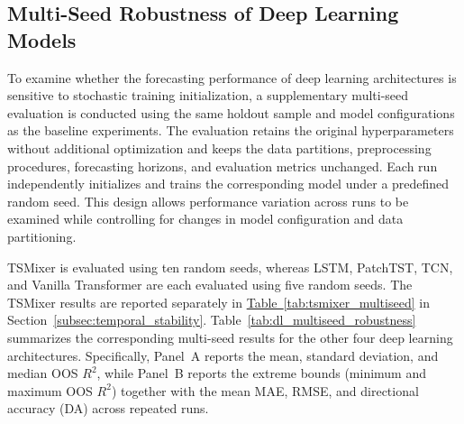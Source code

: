 \documentclass[12pt,twoside]{ord}
\begin{document}
\subsection{Multi-Seed Robustness of Deep Learning Models}\label{subsec:multiseed_robustness}

To examine whether the forecasting performance of deep learning architectures is sensitive to stochastic training initialization, a supplementary multi-seed evaluation is conducted using the same holdout sample and model configurations as the baseline experiments. The evaluation retains the original hyperparameters without additional optimization and keeps the data partitions, preprocessing procedures, forecasting horizons, and evaluation metrics unchanged. Each run independently initializes and trains the corresponding model under a predefined random seed. This design allows performance variation across runs to be examined while controlling for changes in model configuration and data partitioning.

TSMixer is evaluated using ten random seeds, whereas LSTM, PatchTST, TCN, and Vanilla Transformer are each evaluated using five random seeds. The TSMixer results are reported separately in \hyperref[tab:tsmixer_multiseed]{Table~\ref*{tab:tsmixer_multiseed}} in Section~\ref{subsec:temporal_stability}. Table~\ref{tab:dl_multiseed_robustness} summarizes the corresponding multi-seed results for the other four deep learning architectures. Specifically, Panel~A reports the mean, standard deviation, and median OOS $R^2$, while Panel~B reports the extreme bounds (minimum and maximum OOS $R^2$) together with the mean MAE, RMSE, and directional accuracy (DA) across repeated runs.
\end{document}
